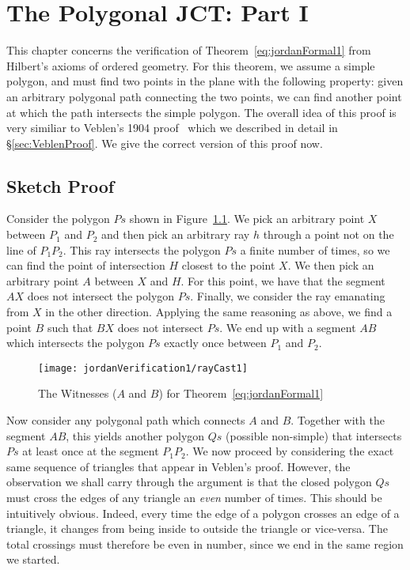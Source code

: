 \chapter{The Polygonal JCT: Part I}\label{chapter:JordanVerification1}
This chapter concerns the verification of Theorem~\ref{eq:jordanFormal1} from Hilbert's axioms of ordered geometry. For this theorem, we assume a simple polygon, and must find two points in the plane with the following property: given an arbitrary polygonal path connecting the two points, we can find another point at which the path intersects the simple polygon. The overall idea of this proof is very similiar to Veblen's 1904 proof~\cite{Veblenphd} which we described in detail in \S\ref{sec:VeblenProof}. We give the correct version of this proof now.

\section{Sketch Proof}\label{sec:ParityProofInformal}
Consider the polygon $Ps$ shown in Figure~\ref{fig:rayCast1}. We pick an arbitrary point $X$ between $P_1$ and $P_2$  and then pick an arbitrary ray $h$ through a point not on the line of $P_1P_2$. This ray intersects the polygon $Ps$ a finite number of times, so we can find the point of intersection $H$ closest to the point $X$. We then pick an arbitrary point $A$ between $X$ and $H$. For this point, we have that the segment $AX$ does not intersect the polygon $Ps$. Finally, we consider the ray emanating from $X$ in the other direction. Applying the same reasoning as above, we find a point $B$ such that $BX$ does not intersect $Ps$. We end up with a segment $AB$ which intersects the polygon $Ps$ exactly once between $P_1$ and $P_2$.

\begin{figure}
\centering\texttt{[image: jordanVerification1/rayCast1]}
\caption{The Witnesses ($A$ and $B$) for Theorem~\ref{eq:jordanFormal1}}
\label{fig:rayCast1}
\end{figure}

\newcommand{\insideoutsideclaim}{every time the edge of a polygon crosses an edge of a triangle, it changes from being inside to outside the triangle or vice-versa}

Now consider any polygonal path which connects $A$ and $B$. Together with the segment $AB$, this yields another polygon $Qs$ (possible non-simple) that intersects $Ps$ at least once at the segment $P_1P_2$. We now proceed by considering the exact same sequence of triangles that appear in Veblen's proof. However, the observation we shall carry through the argument is that the closed polygon $Qs$ must cross the edges of any triangle an \emph{even} number of times. This should be intuitively obvious. Indeed, \insideoutsideclaim. The total crossings must therefore be even in number, since we end in the same region we started.

